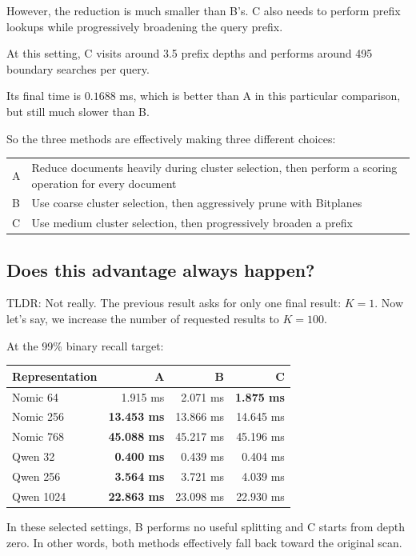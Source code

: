 However, the reduction is much smaller than B's. C also needs to perform prefix lookups while progressively broadening the query prefix.

At this setting, C visits around 3.5 prefix depths and performs around 495 boundary searches per query.

Its final time is $0.1688$ ms, which is better than A in this particular comparison, but still much slower than B. 

So the three methods are effectively making three different choices:
\begin{center}\small
\begin{tabularx}{\linewidth}{@{}lY@{}}\toprule
A & Reduce documents heavily during cluster selection, then perform a scoring operation for every document\\
B & Use coarse cluster selection, then aggressively prune with Bitplanes\\
C & Use medium cluster selection, then progressively broaden a prefix\\\bottomrule
\end{tabularx}
\end{center}

\subsection{Does this advantage always happen?}
TLDR: Not really. The previous result asks for only one final result: $K=1$. Now let's say, we increase the number of requested results to $K=100$.

At the 99\% binary recall target:
\begin{center}\small
\begin{tabular}{@{}lrrr@{}}\toprule
Representation & A & B & C\\\midrule
Nomic 64 & 1.915 ms & 2.071 ms & \textbf{1.875 ms}\\
Nomic 256 & \textbf{13.453 ms} & 13.866 ms & 14.645 ms\\
Nomic 768 & \textbf{45.088 ms} & 45.217 ms & 45.196 ms\\
Qwen 32 & \textbf{0.400 ms} & 0.439 ms & 0.404 ms\\
Qwen 256 & \textbf{3.564 ms} & 3.721 ms & 4.039 ms\\
Qwen 1024 & \textbf{22.863 ms} & 23.098 ms & 22.930 ms\\\bottomrule
\end{tabular}
\end{center}
In these selected settings, B performs no useful splitting and C starts from depth zero. In other words, both methods effectively fall back toward the original scan.

